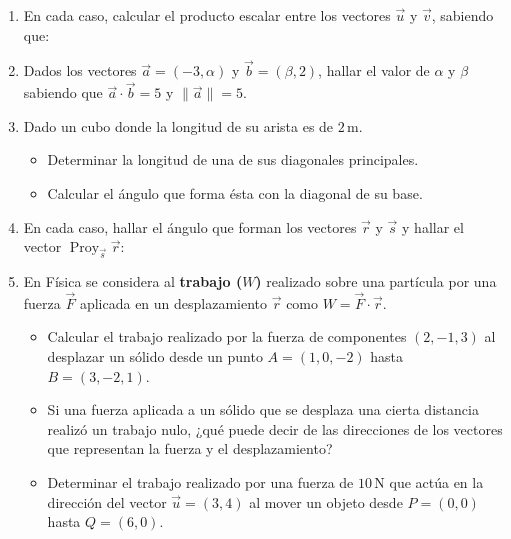 \begin{enumerate}[\hspace{-3mm}$1)$]
\item En cada caso, calcular el producto escalar entre los vectores $\vec u$ y $\vec v$, sabiendo que:

\item Dados los vectores $\vec a=(-3,\alpha)$ y $\vec b=(\beta,2)$, hallar el valor de $\alpha$ y $\beta$ sabiendo que $\vec a\cdot\vec b=5$ y $\|\vec a\|=5$.

\item Dado un cubo donde la longitud de su arista es de $2\,\text{m}$.
\begin{itemize}
\item[a)] Determinar la longitud de una de sus diagonales principales.
\item[b)] Calcular el ángulo que forma ésta con la diagonal de su base.
\end{itemize}

\item En cada caso, hallar el ángulo que forman los vectores $\vec r$ y $\vec s$ y hallar el vector $\operatorname{Proy}_{\vec s}\vec r$:
\begin{enumerate}
\end{enumerate}

\item En Física se considera al {\bf trabajo ($W$)} realizado sobre una partícula por una fuerza $\vec F$ aplicada en un desplazamiento $\vec r$ como $W=\vec F\cdot\vec r$.
\begin{itemize}
\item[a)] Calcular el trabajo realizado por la fuerza de componentes $(2,-1,3)$ al desplazar un sólido desde un punto $A=(1,0,-2)$ hasta $B=(3,-2,1)$.
\item[b)] Si una fuerza aplicada a un sólido que se desplaza una cierta distancia realizó un trabajo nulo, ¿qué puede decir de las direcciones de los vectores que representan la fuerza y el desplazamiento?
\item[c)] Determinar el trabajo realizado por una fuerza de $10\,\text{N}$ que actúa en la dirección del vector $\vec u=(3,4)$ al mover un objeto desde $P=(0,0)$ hasta $Q=(6,0)$.
\end{itemize}


\end{enumerate}
